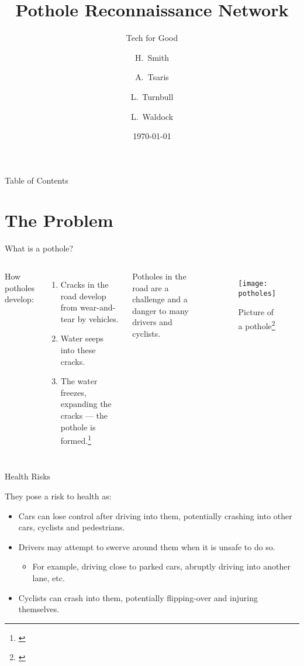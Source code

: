 \documentclass{beamer}
\title{Pothole Reconnaissance Network}
\subtitle{Tech for Good}
\author[Smith, Tsaris, Turnbull, Waldock]{H.~Smith \and A.~Tsaris \and L.~Turnbull \and L.~Waldock}
\institute[5J]{Group 5J}
\date{\today}
\begin{document}
\frame{\titlepage}

\begin{frame}{Table of Contents}
    \tableofcontents
\end{frame}

\section{The Problem}

\begin{frame}{What is a pothole?}

\begin{columns}


How potholes develop:
\begin{enumerate}
    \item Cracks in the road develop from wear-and-tear by vehicles.
    \item Water seeps into these cracks.
    \item The water freezes, expanding the cracks --- the pothole is formed.\footnote[frame]{\cite{how-are-potholes-formed}}
\end{enumerate}
Potholes in the road are a challenge and a danger to many drivers and cyclists.

\begin{figure}
    \texttt{[image: potholes]}
    \caption{Picture of a pothole\footnote[frame]{\cite{pothole-pic}}}
\end{figure}

\end{columns}

\end{frame}

\begin{frame}{Health Risks}

They pose a risk to \alert{health} as:

\begin{itemize}
    \item Cars can lose control after driving into them, potentially crashing into other cars, cyclists and pedestrians.
    \item Drivers may attempt to swerve around them when it is unsafe to do so.
    \begin{itemize}
        \item For example, driving close to parked cars, abruptly driving into another lane, etc.
    \end{itemize}
    \item Cyclists can crash into them, potentially flipping-over and injuring themselves.
\end{itemize}

\end{frame}
\end{document}
